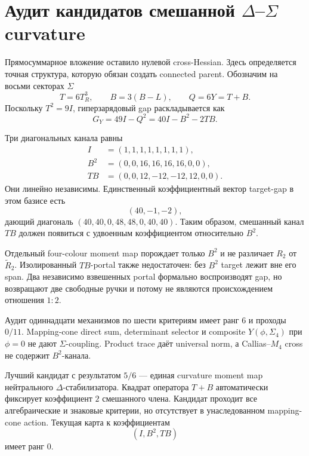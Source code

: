 \chapter{Аудит кандидатов смешанной
\texorpdfstring{$\Delta$--$\Sigma$}{Delta--Sigma} curvature}
\label{ch:v10-h15-r2-delta-sigma-mixed-curvature-audit}

Прямосуммарное вложение оставило нулевой cross-Hessian. Здесь определяется
точная структура, которую обязан создать connected parent. Обозначим на
восьми секторах $\Sigma$
\begin{equation}
 T=6T_R^3,\qquad B=3(B-L),\qquad Q=6Y=T+B.
\end{equation}
Поскольку $T^2=9I$, гиперзарядовый gap раскладывается как
\begin{equation}
 \boxed{G_Y=49I-Q^2=40I-B^2-2TB.}
\end{equation}

Три диагональных канала равны
\begin{align}
 I&=(1,1,1,1,1,1,1,1),\\
 B^2&=(0,0,16,16,16,16,0,0),\\
 TB&=(0,0,12,-12,-12,12,0,0).
\end{align}
Они линейно независимы. Единственный коэффициентный вектор target-gap в
этом базисе есть
\begin{equation}
 (40,-1,-2),
\end{equation}
дающий диагональ $(40,40,0,48,48,0,40,40)$. Таким образом, смешанный канал
$TB$ должен появиться с удвоенным коэффициентом относительно $B^2$.

Отдельный four-colour moment map порождает только $B^2$ и не различает
$R_2$ от $\widetilde R_2$. Изолированный $TB$-portal также недостаточен:
без $B^2$ target лежит вне его span. Два независимо взвешенных portal
формально воспроизводят gap, но возвращают две свободные ручки и потому не
являются происхождением отношения $1:2$.

Аудит одиннадцати механизмов по шести критериям имеет ранг $6$ и проходы
$0/11$. Mapping-cone direct sum, determinant selector и composite
$Y(\phi,\Sigma_4)$ при $\phi=0$ не дают $\Sigma$-coupling. Product trace
даёт universal norm, а Callias--$M_4$ cross не содержит $B^2$-канала.

Лучший кандидат с результатом $5/6$ --- единая curvature moment map
нейтрального $\Delta$-стабилизатора. Квадрат оператора $T+B$
автоматически фиксирует коэффициент $2$ смешанного члена. Кандидат проходит
все алгебраические и знаковые критерии, но отсутствует в унаследованном
mapping-cone action. Текущая карта к коэффициентам
\begin{equation}
 (I,B^2,TB)
\end{equation}
имеет ранг $0$.

